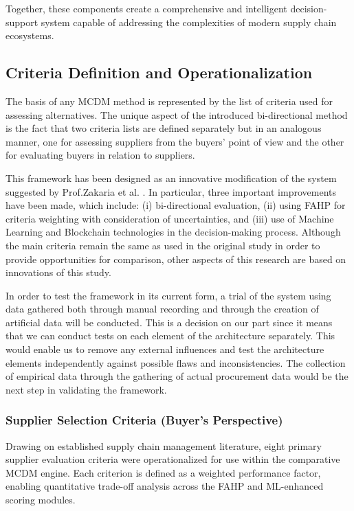 \documentclass[11pt]{article}
\begin{document}
Together, these components create a comprehensive and intelligent decision-support system capable of addressing the complexities of modern supply chain ecosystems.

\subsection{Criteria Definition and Operationalization}

The basis of any MCDM method is represented by the list of criteria used for assessing alternatives. The unique aspect of the introduced bi-directional method is the fact that two criteria lists are defined separately but in an analogous manner, one for assessing suppliers from the buyers' point of view and the other for evaluating buyers in relation to suppliers.

This framework has been designed as an innovative modification of the system suggested by Prof.Zakaria et al. \cite{ref77}. In particular, three important improvements have been made, which include: (i) bi-directional evaluation, (ii) using FAHP for criteria weighting with consideration of uncertainties, and (iii) use of Machine Learning and Blockchain technologies in the decision-making process. Although the main criteria remain the same as used in the original study in order to provide opportunities for comparison, other aspects of this research are based on innovations of this study.

In order to test the framework in its current form, a trial of the system using data gathered both through manual recording and through the creation of artificial data will be conducted. This is a decision on our part since it means that we can conduct tests on each element of the architecture separately. This would enable us to remove any external influences and test the architecture elements independently against possible flaws and inconsistencies. The collection of empirical data through the gathering of actual procurement data would be the next step in validating the framework.

\subsubsection{Supplier Selection Criteria (Buyer's Perspective)}

Drawing on established supply chain management literature, eight primary supplier evaluation criteria were operationalized for use within the comparative MCDM engine. Each criterion is defined as a weighted performance factor, enabling quantitative trade-off analysis across the FAHP and ML-enhanced scoring modules.
\end{document}
